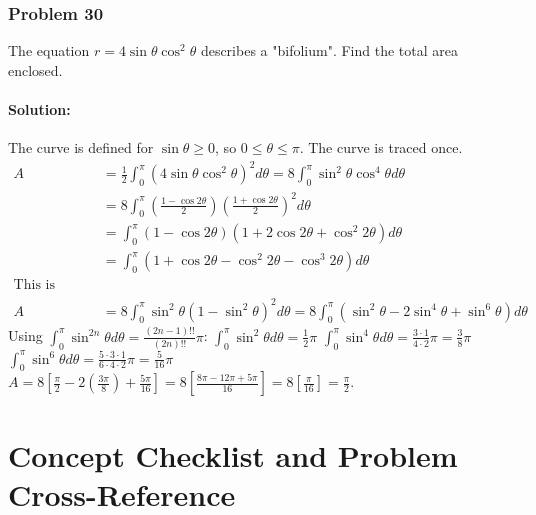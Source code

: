 \documentclass{article}
\begin{document}
\subsubsection*{Problem 30}
The equation $r=4\sin\theta\cos^2\theta$ describes a "bifolium". Find the total area enclosed.
\paragraph{Solution:}
The curve is defined for $\sin\theta \ge 0$, so $0 \le \theta \le \pi$. The curve is traced once.
\begin{align*} A &= \frac{1}{2}\int_0^\pi (4\sin\theta\cos^2\theta)^2 d\theta = 8\int_0^\pi \sin^2\theta\cos^4\theta d\theta \\ &= 8\int_0^\pi (\frac{1-\cos2\theta}{2})(\frac{1+\cos2\theta}{2})^2 d\theta \\ &= \int_0^\pi (1-\cos2\theta)(1+2\cos2\theta+\cos^2 2\theta) d\theta \\ &= \int_0^\pi (1+\cos2\theta-\cos^2 2\theta - \cos^3 2\theta) d\theta \\ \text{This is getting complex. Let's use Wallis' formula after substitution.} \\ A &= 8\int_0^\pi \sin^2\theta(1-\sin^2\theta)^2 d\theta = 8\int_0^\pi (\sin^2\theta-2\sin^4\theta+\sin^6\theta)d\theta \end{align*}
Using $\int_0^\pi \sin^{2n}\theta d\theta = \frac{(2n-1)!!}{(2n)!!}\pi$:
$\int_0^\pi \sin^2\theta d\theta = \frac{1}{2}\pi$
$\int_0^\pi \sin^4\theta d\theta = \frac{3 \cdot 1}{4 \cdot 2}\pi = \frac{3}{8}\pi$
$\int_0^\pi \sin^6\theta d\theta = \frac{5 \cdot 3 \cdot 1}{6 \cdot 4 \cdot 2}\pi = \frac{5}{16}\pi$
$A = 8[\frac{\pi}{2} - 2(\frac{3\pi}{8}) + \frac{5\pi}{16}] = 8[\frac{8\pi-12\pi+5\pi}{16}] = 8[\frac{\pi}{16}] = \frac{\pi}{2}$.

\newpage

\section*{Concept Checklist and Problem Cross-Reference}
\end{document}
